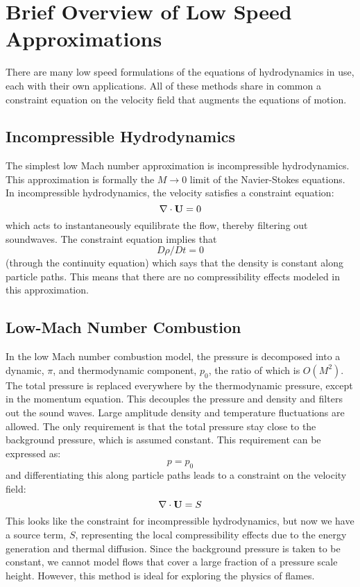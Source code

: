 \section{Brief Overview of Low Speed Approximations}

There are many low speed formulations of the equations of hydrodynamics
in use, each with their own applications.  All of these methods share in
common a constraint equation on the velocity field that augments the
equations of motion.  

\subsection{Incompressible Hydrodynamics}

The simplest low Mach number approximation is incompressible
hydrodynamics. This approximation is formally the $M \rightarrow 0$
limit of the Navier-Stokes equations. In incompressible hydrodynamics,
the velocity satisfies a constraint equation:
\begin{equation}
\nabla \cdot {\bf U} = 0
\end{equation}
which acts to instantaneously equilibrate the flow, thereby filtering
out soundwaves.  The constraint equation implies that
\begin{equation}
D\rho/Dt = 0
\end{equation}
(through the continuity equation) which says that the density is
constant along particle paths. This means that there are no
compressibility effects modeled in this approximation.

\subsection{Low-Mach Number Combustion}

In the low Mach number combustion model, the pressure is decomposed
into a dynamic, $\pi$, and thermodynamic component, $p_0$, the ratio
of which is $O(M^2)$. The total pressure is replaced everywhere by the
thermodynamic pressure, except in the momentum equation. This
decouples the pressure and density and filters out the sound
waves. Large amplitude density and temperature fluctuations are
allowed. The only requirement is that the total pressure stay close to
the background pressure, which is assumed constant. This requirement
can be expressed as:
\begin{equation}
p = p_0
\end{equation}
and differentiating this along particle paths leads to a constraint on
the velocity field: 
\begin{equation}
\nabla \cdot {\bf U} = S 
\end{equation}
This looks like the constraint for incompressible hydrodynamics, but
now we have a source term, $S$, representing the local compressibility
effects due to the energy generation and thermal diffusion.  Since the
background pressure is taken to be constant, we cannot model flows
that cover a large fraction of a pressure scale height. However, this
method is ideal for exploring the physics of flames.

